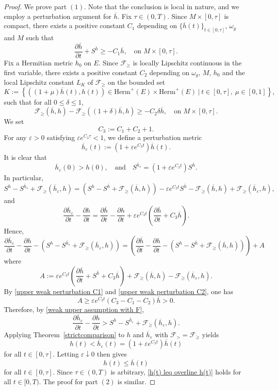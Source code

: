 \documentclass[12pt, reqno]{amsart}
\newcommand\sF{{\mathscr F}}
\theoremstyle{plain}
\theoremstyle{definition}
\newcommand{\bproof}{\begin{proof}}
\newcommand{\eproof}{\end{proof}}
\newcommand{\p}{\partial}
\newcommand{\eps}{\varepsilon}
\newcommand{\beq}{\begin{equation}}
\newcommand{\eeq}{\end{equation}}
\newcommand{\qtq}[1]{\quad\mbox{#1}\quad}
\renewcommand{\>}{\rightarrow}
\renewcommand{\>}{\rightarrow}
\renewcommand{\p}{{\partial}}
\numberwithin{equation}{section} %
\begin{document}
\bproof We prove part $(1)$. Note that the conclusion is local in nature, and we employ a perturbation argument for $\overline h$.  Fix $\tau\in (0,T)$. Since $M\times[0,\tau]$ is compact, there exists a positive constant $C_1$ depending on $\{\overline h(t)\}_{t\in[0,\tau]}$, $\omega_g$ and $M$ such that
\beq
\frac{\p \overline h}{\p t}+S^{\overline h}\geq -C_1\overline h,\quad\text{on $M\times[0,\tau]$.}
\label{upper weak perturbation C1}
\eeq
Fix a Hermitian metric $h_0$ on $E$. Since $\sF_\geq$ is locally Lipschitz continuous in the first variable, there exists a positive constant $C_2$ depending on  $\omega_g$,  $M$, $h_0$ and  the local Lipschitz constant $L_K$ of $\sF_{\geq }$ on
the bounded set
\beq K:=
\left\{\left((1+\mu)\overline h(t), h(t)\right)\in \mathrm{Herm}^+(E)\times \mathrm{Herm}^+(E)\ |\  t\in [0,\tau],\ \mu\in [0,1]\right\},
\eeq  such that for all $0\leq\delta\leq1$,
\beq
\sF_\geq(\overline h, h)-\sF_\geq((1+\delta)\overline h, h)\geq -C_2\delta\overline h,\quad\text{on $M\times[0,\tau]$.}
\label{upper weak perturbation C2}
\eeq
We set
\beq
C_3:=C_1+C_2+1.
\eeq
For any $\eps>0$ satisfying $\eps e^{C_3\tau}<1$,  we define a perturbation metric
\beq
\overline h_\eps(t):=\left(1+\eps e^{C_3t}\right)\overline h(t).
\eeq
It is clear that
\beq
\overline h_\eps(0)>h(0),\qtq{and}
S^{\overline h_\eps}=\left(1+\eps e^{C_3t}\right)S^{\overline h}.
\eeq
In particular,
\beq  S^h-S^{\overline h_\eps}+\sF_\geq(\overline h_\eps, h)= \left(S^h-S^{\overline h}+\sF_\geq(\overline h, h)\right)-\eps e^{C_3t}S^{\overline h}-\sF_\geq(\overline h, h)+\sF_\geq(\overline h_\eps, h),
\eeq
and
\beq \frac{\p \overline h_\eps}{\p t}-\frac{\p h}{\p t}=\frac{\p \overline h}{\p t}-\frac{\p h}{\p t}+\eps e^{C_3t}\left(\frac{\p \overline h}{\p t}+C_3\overline h\right).\eeq
Hence,
\beq \frac{\p \overline h_\eps}{\p t}-\frac{\p h}{\p t}
-\left(S^h-S^{\overline h_\eps}+\sF_\geq(\overline h_\eps, h)\right)= \left(\frac{\p \overline h}{\p t}-\frac{\p h}{\p t}
-\left(S^h-S^{\overline h}+\sF_\geq(\overline h, h)\right)\right)+A\eeq
where
\beq A:=\eps e^{C_3t}\left(\frac{\p \overline h}{\p t}+S^{\overline h}+C_3\overline h\right)
+\sF_\geq(\overline h, h)-\sF_\geq(\overline h_\eps, h).\eeq
By \eqref{upper weak perturbation C1} and \eqref{upper weak perturbation C2}, one has
\beq A\geq\eps e^{C_3t}(C_3-C_1-C_2)\overline h>0.\eeq
Therefore, by \eqref{weak upper assumption with F},
\beq
\frac{\p \overline h_\eps}{\p t}-\frac{\p h}{\p t}
>S^h-S^{\overline h_\eps}+\sF_\geq(\overline h_\eps, h).
\eeq
Applying Theorem~\ref{strictcomparison} to $h$ and $\overline h_\eps$ with $\sF_> = \sF_\geq$ yields
\beq
h(t)<\overline h_\eps(t)=\left(1+\eps e^{C_3t}\right)\overline h(t)
\eeq
for all $t\in[0,\tau]$. Letting $\eps \downarrow 0$ then gives
\beq
h(t)\leq\overline h(t)\label{h(t) leq overline h(t)}
\eeq
for all $t\in[0,\tau]$. Since $\tau \in (0,T)$ is arbitrary, \eqref{h(t) leq overline h(t)} holds for all $t\in [0,T)$. The proof for part $(2)$ is similar.
\eproof
\end{document}
